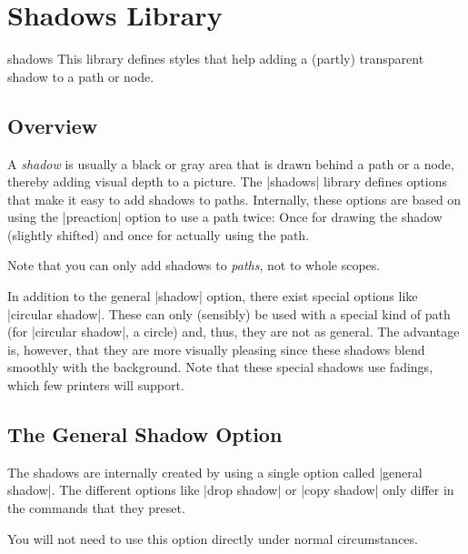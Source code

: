 %
%
%


\section{Shadows Library}
\label{section-libs-shadows}

\begin{tikzlibrary}{shadows}
    This library defines styles that help adding a (partly) transparent shadow
    to a path or node.
\end{tikzlibrary}


\subsection{Overview}

A \emph{shadow} is usually a black or gray area that is drawn behind a path or
a node, thereby adding visual depth to a picture. The |shadows| library defines
options that make it easy to add shadows to paths. Internally, these options
are based on using the |preaction| option to use a path twice: Once for drawing
the shadow (slightly shifted) and once for actually using the path.

Note that you can only add shadows to \emph{paths}, not to whole scopes.

In addition to the general |shadow| option, there exist special options like
|circular shadow|. These can only (sensibly) be used with a special kind of
path (for |circular shadow|, a circle) and, thus, they are not as general. The
advantage is, however, that they are more visually pleasing since these shadows
blend smoothly with the background. Note that these special shadows use
fadings, which few printers will support.


\subsection{The General Shadow Option}

The shadows are internally created by using a single option called
|general shadow|. The different options like |drop shadow| or |copy shadow|
only differ in the commands that they preset.

You will not need to use this option directly under normal circumstances.

